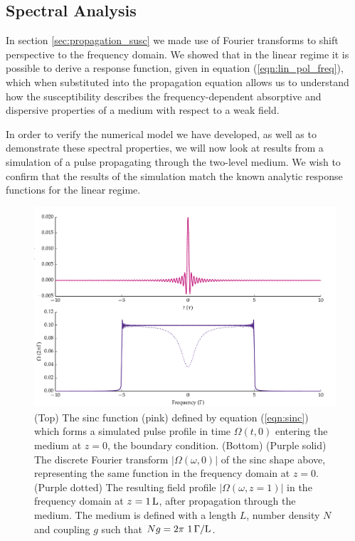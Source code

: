   \subsection{Spectral Analysis}

    In section \ref{sec:propagation_susc} we made use of Fourier transforms to
    shift perspective to the frequency domain. We showed that in the linear
    regime it is possible to derive a response function, given in equation
    (\ref{eqn:lin_pol_freq}), which when substituted into the propagation
    equation allows us to understand how the susceptibility describes the
    frequency-dependent absorptive and dispersive properties of a medium with
    respect to a weak field.

    In order to verify the numerical model we have developed, as well as to
    demonstrate these spectral properties, we will now look at results from a
    simulation of a pulse propagating through the two-level medium. We wish to
    confirm that the results of the simulation match the known analytic response
    functions for the linear regime.

    \begin{figure}
    \includegraphics[width=\linewidth]
      {figs/02_propagation/two_mb_solve_f03_fig2.pdf}
    \caption{
    (Top) The sinc function (pink) defined by equation (\ref{eqn:sinc}) which
    forms a simulated pulse profile in time $\Omega(t,0)$ entering the medium at
    $z=0$, \ie the boundary condition. (Bottom) (Purple solid) The discrete
    Fourier transform $\lvert \Omega(\omega,0) \rvert$ of the sinc shape above,
    representing the same function in the frequency domain at $z=0$. (Purple
    dotted) The resulting field profile $\lvert \Omega(\omega,z=1) \rvert$ in
    the frequency domain at $z = \unit[1]{L}$, after propagation through the
    medium. The medium is defined with a length $L$, number density $N$ and
    coupling $g$ such that $Ng = \unit[2\pi~1]{\Gamma /L}$.
    }
    \label{fig:sinc_time_freq}
    \end{figure}

